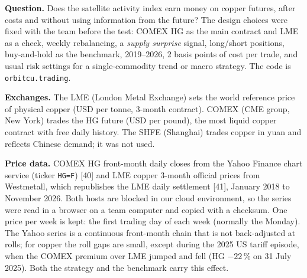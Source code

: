 \documentclass[10pt,a4paper]{article}
\newcommand{\code}[1]{\texttt{\small #1}}
\begin{document}
\textbf{Question.} Does the satellite activity index earn money on copper futures, after costs and without using information from the future? The design choices were fixed with the team before the test: COMEX HG as the main contract and LME as a check, weekly rebalancing, a \emph{supply surprise} signal, long/short positions, buy-and-hold as the benchmark, 2019--2026, 2 basis points of cost per trade, and usual risk settings for a single-commodity trend or macro strategy. The code is \code{orbitcu.trading}.

\textbf{Exchanges.} The LME (London Metal Exchange) sets the world reference price of physical copper (USD per tonne, 3-month contract). COMEX (CME group, New York) trades the HG future (USD per pound), the most liquid copper contract with free daily history. The SHFE (Shanghai) trades copper in yuan and reflects Chinese demand; it was not used.

\textbf{Price data.} COMEX HG front-month daily closes from the Yahoo Finance chart service (ticker \texttt{HG=F}) [40] and LME copper 3-month official prices from Westmetall, which republishes the LME daily settlement [41], January 2018 to November 2026. Both hosts are blocked in our cloud environment, so the series were read in a browser on a team computer and copied with a checksum. One price per week is kept: the first trading day of each week (normally the Monday). The Yahoo series is a continuous front-month chain that is not back-adjusted at rolls; for copper the roll gaps are small, except during the 2025 US tariff episode, when the COMEX premium over LME jumped and fell (HG $-22$\,\% on 31 July 2025). Both the strategy and the benchmark carry this effect.
\end{document}
